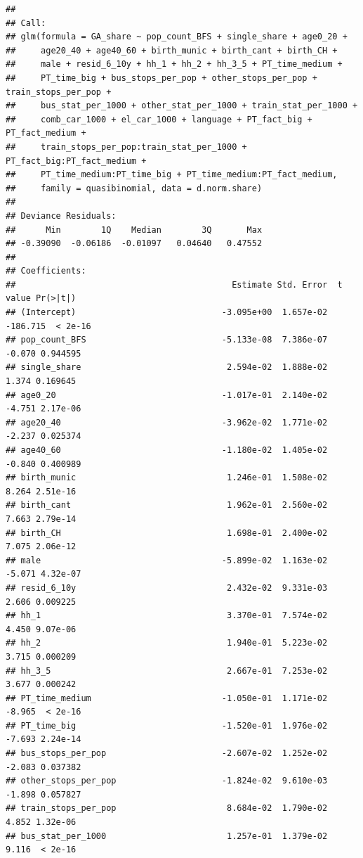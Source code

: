 \documentclass[
]{article}
\begin{document}
\begin{verbatim}
## 
## Call:
## glm(formula = GA_share ~ pop_count_BFS + single_share + age0_20 + 
##     age20_40 + age40_60 + birth_munic + birth_cant + birth_CH + 
##     male + resid_6_10y + hh_1 + hh_2 + hh_3_5 + PT_time_medium + 
##     PT_time_big + bus_stops_per_pop + other_stops_per_pop + train_stops_per_pop + 
##     bus_stat_per_1000 + other_stat_per_1000 + train_stat_per_1000 + 
##     comb_car_1000 + el_car_1000 + language + PT_fact_big + PT_fact_medium + 
##     train_stops_per_pop:train_stat_per_1000 + PT_fact_big:PT_fact_medium + 
##     PT_time_medium:PT_time_big + PT_time_medium:PT_fact_medium, 
##     family = quasibinomial, data = d.norm.share)
## 
## Deviance Residuals: 
##      Min        1Q    Median        3Q       Max  
## -0.39090  -0.06186  -0.01097   0.04640   0.47552  
## 
## Coefficients:
##                                           Estimate Std. Error  t value Pr(>|t|)
## (Intercept)                             -3.095e+00  1.657e-02 -186.715  < 2e-16
## pop_count_BFS                           -5.133e-08  7.386e-07   -0.070 0.944595
## single_share                             2.594e-02  1.888e-02    1.374 0.169645
## age0_20                                 -1.017e-01  2.140e-02   -4.751 2.17e-06
## age20_40                                -3.962e-02  1.771e-02   -2.237 0.025374
## age40_60                                -1.180e-02  1.405e-02   -0.840 0.400989
## birth_munic                              1.246e-01  1.508e-02    8.264 2.51e-16
## birth_cant                               1.962e-01  2.560e-02    7.663 2.79e-14
## birth_CH                                 1.698e-01  2.400e-02    7.075 2.06e-12
## male                                    -5.899e-02  1.163e-02   -5.071 4.32e-07
## resid_6_10y                              2.432e-02  9.331e-03    2.606 0.009225
## hh_1                                     3.370e-01  7.574e-02    4.450 9.07e-06
## hh_2                                     1.940e-01  5.223e-02    3.715 0.000209
## hh_3_5                                   2.667e-01  7.253e-02    3.677 0.000242
## PT_time_medium                          -1.050e-01  1.171e-02   -8.965  < 2e-16
## PT_time_big                             -1.520e-01  1.976e-02   -7.693 2.24e-14
## bus_stops_per_pop                       -2.607e-02  1.252e-02   -2.083 0.037382
## other_stops_per_pop                     -1.824e-02  9.610e-03   -1.898 0.057827
## train_stops_per_pop                      8.684e-02  1.790e-02    4.852 1.32e-06
## bus_stat_per_1000                        1.257e-01  1.379e-02    9.116  < 2e-16

\end{verbatim}
\end{document}
